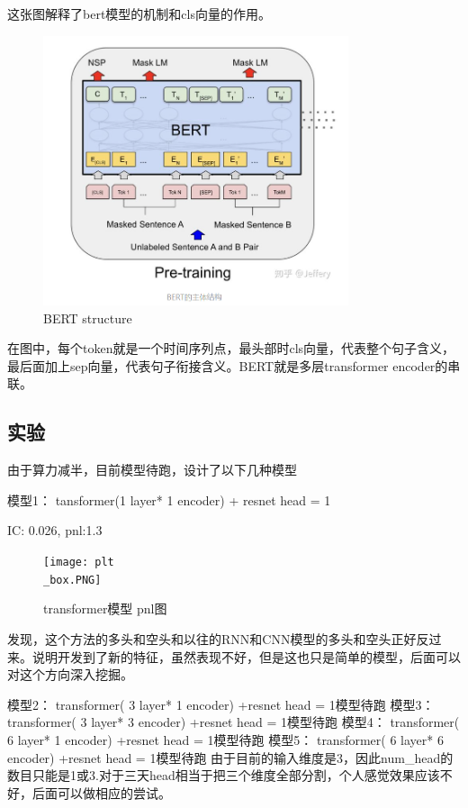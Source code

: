 \documentclass[11pt]{ctexart}
\begin{document}
这张图解释了bert模型的机制和cls向量的作用。
\begin{figure}[H]
\begin{center}
\includegraphics[width=0.8\textwidth]{str4.PNG}
\end{center}
\caption{BERT structure}
\label{FIG.9}
\end{figure}
在图中，每个token就是一个时间序列点，最头部时cls向量，代表整个句子含义，最后面加上sep向量，代表句子衔接含义。BERT就是多层transformer encoder的串联。

\subsection{实验}
由于算力减半，目前模型待跑，设计了以下几种模型

模型1： tansformer(1 layer* 1 encoder) + resnet head = 1

{\kaishu \small IC: 0.026, pnl:1.3}

\begin{figure}[H]
\begin{center}
\texttt{[image: plt\\\_box.PNG]}
\end{center}
\caption{transformer模型 pnl图}
\label{FIG.10}
\end{figure}
发现，这个方法的多头和空头和以往的RNN和CNN模型的多头和空头正好反过来。说明开发到了新的特征，虽然表现不好，但是这也只是简单的模型，后面可以对这个方向深入挖掘。

模型2： transformer( 3 layer* 1 encoder) +resnet head = 1模型待跑
模型3： transformer( 3 layer* 3 encoder) +resnet head = 1模型待跑
模型4： transformer( 6 layer* 1 encoder) +resnet head = 1模型待跑
模型5： transformer( 6 layer* 6 encoder) +resnet head = 1模型待跑
由于目前的输入维度是3，因此num\_head的数目只能是1或3.对于三天head相当于把三个维度全部分割，个人感觉效果应该不好，后面可以做相应的尝试。
\end{document}

